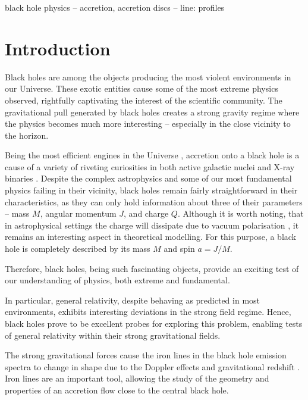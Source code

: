 \documentclass[fleqn,usenatbib,useAMS]{mnras}
\begin{document}
\begin{keywords}
black hole physics -- accretion, accretion discs -- line: profiles
\end{keywords}

\section{Introduction}

Black holes are among the objects producing the most violent environments in our Universe. These exotic entities cause some of the most extreme physics observed, rightfully captivating the interest of the scientific community. The gravitational pull generated by black holes creates a strong gravity regime where the physics becomes much more interesting -- especially in the close vicinity to the horizon. 

Being the most efficient engines in the Universe \citep{rees1984black}, accretion onto a black hole is a cause of a variety of riveting curiosities in both active galactic nuclei and X-ray binaries \citep{taylor2018exploring}. Despite the complex astrophysics and some of our most fundamental physics failing in their vicinity, black holes remain fairly straightforward in their characteristics, as they can only hold information about three of their parameters -- mass $M$, angular momentum $J$, and charge $Q$. Although it is worth noting, that in astrophysical settings the charge will dissipate due to vacuum polarisation \citep{reynolds2003fluorescent}, it remains an interesting aspect in theoretical modelling. For this purpose, a black hole is completely described by its mass $M$ and spin $a = J/M$.

Therefore, black holes, being such fascinating objects, provide an exciting test of our understanding of physics, both extreme and fundamental. 

In particular, general relativity, despite behaving as predicted in most environments, exhibits interesting deviations in the strong field regime. Hence, black holes prove to be excellent probes for exploring this problem, enabling tests of general relativity within their strong gravitational fields.

The strong gravitational forces cause the iron lines in the black hole emission spectra to change in shape due to the Doppler effects and gravitational redshift \citep{fabian2000broad}. Iron lines are an important tool, allowing the study of the geometry and properties of an accretion flow close to the central black hole. 
\end{document}
